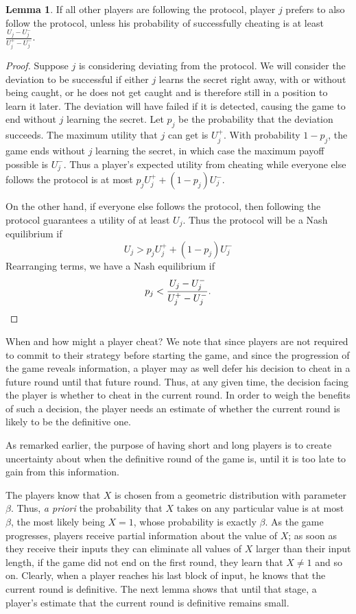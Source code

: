 \documentclass[12pt]{article}
\theoremstyle{definition}
\newtheorem{lemma}[theorem]{Lemma}
\newcommand{\Uplus}{U^{+}}
\newcommand{\Uminus}{U^{-}}
\begin{document}
\begin{lemma}\label{lem:threshold}
If all other players are following the protocol, player $j$ prefers 
to also follow the protocol, unless his probability of successfully 
cheating is at least $\frac{U_j -\Uminus_j}{\Uplus_j -\Uminus_j}$.
\end{lemma}
\begin{proof}
Suppose $j$ is considering deviating from the protocol. We will consider the 
deviation to be successful if either $j$ learns the secret right away, with 
or without being caught, or he does not get caught
and is therefore still in a position to learn it later. The deviation will 
have failed if it is detected, causing the game to end without $j$ learning 
the secret.
Let $p_j$ be the probability that the deviation succeeds.
The maximum utility that $j$ can get is $\Uplus_j$. With probability $1-p_j$, 
the game ends without $j$ learning the secret,
in which case the maximum payoff possible is $\Uminus_j$. Thus a player's 
expected utility from cheating while everyone else follows the 
protocol is at most $p_j\Uplus_j+(1-p_j)\Uminus_j$.

On the other hand, if everyone else follows the protocol, then following 
the protocol guarantees a utility of at least $U_j$. 
Thus the protocol will be a Nash equilibrium if 
\[
U_j > p_j\Uplus_j + (1 - p_j)\Uminus_j 
\]
Rearranging terms, we have a Nash equilibrium if 
\[
p_j < \frac{U_j -\Uminus_j}{\Uplus_j -\Uminus_j}. \qedhere 
\]
\end{proof}

\smallskip

When and how might a player cheat? We note that since players are not 
required to commit to their strategy before starting the game, and
since the progression of the game reveals information, a player may as 
well defer his decision to cheat in a future round until that future round. 
Thus, at any given time, the decision facing the player is whether to 
cheat in the current round. In order to weigh the benefits 
of such a decision, the player needs an estimate of whether the current 
round is likely to be the definitive one. 

As remarked earlier, the purpose of having short and long players is to 
create uncertainty about when the definitive round of the game is, until it 
is too late to gain from this information.  

The players know that $X$ is chosen from a geometric distribution with 
parameter $\beta$. Thus, \emph{a priori} the 
probability that $X$ takes on any particular value is at most $\beta$, 
the most likely being $X=1$, whose probability is exactly $\beta$. 
As the game progresses, players receive partial information about the 
value of $X$; as soon as they receive their inputs they can eliminate all
values of $X$ larger than their input length, if the game did not end on 
the first round, they learn that $X \neq 1$ and so on. Clearly, when a 
player reaches his last block of input, he knows that the current round 
is definitive. The next lemma shows that until that stage, a player's 
estimate that the current round is definitive remains small. 
\end{document}
